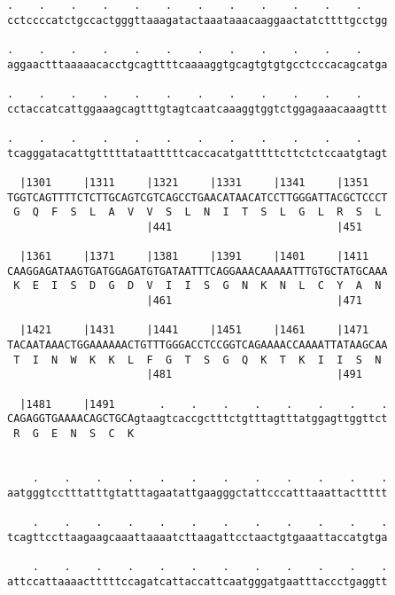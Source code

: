 \documentclass{article}
\begin{document}
\begin{Verbatim}
.    .    .    .    .    .    .    .    .    .    .    .    
cctccccatctgccactgggttaaagatactaaataaacaaggaactatcttttgcctgg
                                                            
.    .    .    .    .    .    .    .    .    .    .    .    
aggaactttaaaaacacctgcagttttcaaaaggtgcagtgtgtgcctcccacagcatga
                                                            
.    .    .    .    .    .    .    .    .    .    .    .    
cctaccatcattggaaagcagtttgtagtcaatcaaaggtggtctggagaaacaaagttt
                                                            
.    .    .    .    .    .    .    .    .    .    .    .    
tcagggatacattgtttttataatttttcaccacatgatttttcttctctccaatgtagt
                                                            
  |1301     |1311     |1321     |1331     |1341     |1351   
TGGTCAGTTTTCTCTTGCAGTCGTCAGCCTGAACATAACATCCTTGGGATTACGCTCCCT
 G  Q  F  S  L  A  V  V  S  L  N  I  T  S  L  G  L  R  S  L 
                      |441                          |451    
  
  |1361     |1371     |1381     |1391     |1401     |1411   
CAAGGAGATAAGTGATGGAGATGTGATAATTTCAGGAAACAAAAATTTGTGCTATGCAAA
 K  E  I  S  D  G  D  V  I  I  S  G  N  K  N  L  C  Y  A  N 
                      |461                          |471    
  
  |1421     |1431     |1441     |1451     |1461     |1471   
TACAATAAACTGGAAAAAACTGTTTGGGACCTCCGGTCAGAAAACCAAAATTATAAGCAA
 T  I  N  W  K  K  L  F  G  T  S  G  Q  K  T  K  I  I  S  N 
                      |481                          |491    
  
  |1481     |1491       .    .    .    .    .    .    .    .
CAGAGGTGAAAACAGCTGCAgtaagtcaccgctttctgtttagtttatggagttggttct
 R  G  E  N  S  C  K                                        
                                                            
  
    .    .    .    .    .    .    .    .    .    .    .    .
aatgggtcctttatttgtatttagaatattgaagggctattcccatttaaattacttttt
                                                            
    .    .    .    .    .    .    .    .    .    .    .    .
tcagttccttaagaagcaaattaaaatcttaagattcctaactgtgaaattaccatgtga
                                                            
    .    .    .    .    .    .    .    .    .    .    .    .
attccattaaaactttttccagatcattaccattcaatgggatgaatttaccctgaggtt
                                                            

\end{Verbatim}
\end{document}
